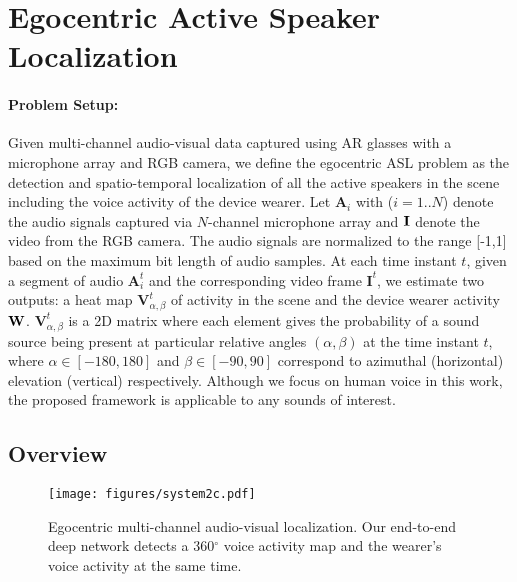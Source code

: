 \documentclass[10pt,twocolumn,letterpaper]{article}
\begin{document}
\section{Egocentric Active Speaker Localization} \label{sec:framework}


\paragraph{Problem Setup:}
Given multi-channel audio-visual data captured using AR glasses with a microphone array and RGB camera, 
we define the egocentric ASL problem as the detection and spatio-temporal localization of all the active speakers in the scene including the voice activity of the device wearer. 
Let $\mathbf{A}_i$ with ($i=1..N$) denote the audio signals captured via $N$-channel microphone array and $\bf{I}$ denote the video from the RGB camera.
The audio signals are normalized to the range [-1,1] based on the maximum bit length of audio samples.
At each time instant $t$, given a segment of audio ${\mathbf{A}^t_i}$ and the corresponding video frame $\mathbf{I}^t$,
we estimate two outputs: a heat map $\mathbf{V}^t_{\alpha,\beta}$ of activity in the scene and the device wearer activity $\bf{W}$. 
$\mathbf{V}^t_{\alpha,\beta}$ is a 2D matrix where each element gives the probability of a sound source being present at 
particular relative angles $(\alpha,\beta)$ at the time instant $t$, 
where $\alpha \in [-180,180]$ and $\beta \in [-90,90]$ correspond to azimuthal (horizontal) elevation (vertical) respectively. 
Although we focus on human voice in this work, the proposed framework is applicable to any sounds of interest. 

\subsection{Overview} \label{sec:overview}

\begin{figure*}[tb]
\centering
\texttt{[image: figures/system2c.pdf]}
\vspace{-5pt}
\caption{Egocentric multi-channel audio-visual localization. Our end-to-end deep network detects a 360$^{\circ}$ voice activity map
	and the wearer's voice activity at the same time.}
\vspace{-5pt}	
\label{fig:system}	
\end{figure*}
\end{document}
